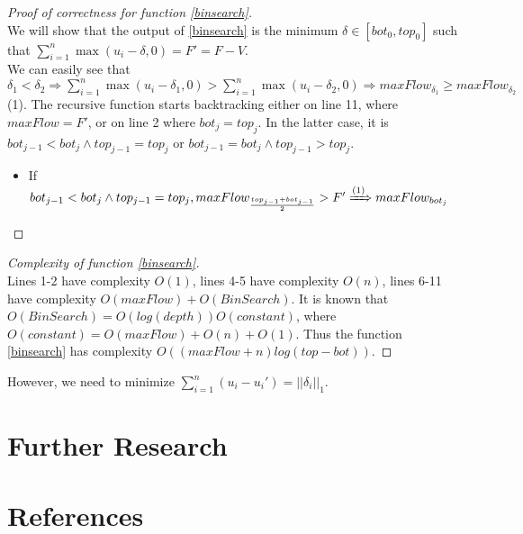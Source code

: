 \documentclass[11pt]{article}
\theoremstyle{definition}
\theoremstyle{corollary}
\begin{document}
    \begin{algorithm}[H]
       \label{binsearch}
       \Output{$\delta$}
       \caption*{\textbf{function} \texttt{BinSearch} }
    \end{algorithm}
    \begin{proof}[Proof of correctness for function \ref{binsearch}] \ \\
       We will show that the output of \ref{binsearch} is the minimum $\delta \in [bot_0, top_0]$ such that
       $\sum\limits_{i=1}^{n}\max{(u_i - \delta, 0)} = F' = F - V$. \\
       We can easily see that $\delta_1 < \delta_2 \Rightarrow \sum\limits_{i=1}^{n}\max{(u_i - \delta_1, 0)} >
       \sum\limits_{i=1}^{n}\max{(u_i - \delta_2, 0)} \Rightarrow maxFlow_{\delta_1} \geq maxFlow_{\delta_2}$ (1).
       The recursive function starts backtracking either on line 11, where $maxFlow = F'$, or on line 2 where $bot_j=top_j$.
       In the latter case, it is $bot_{j-1} < bot_j \wedge top_{j-1} = top_j$ or $bot_{j-1} = bot_j \wedge top_{j-1} >top_j$.
       \begin{itemize}
          \item If $bot_{j-1} < bot_j \wedge top_{j-1} = top_j, maxFlow_{\frac{top_{j-1}+bot_{j-1}}{2}} >F'
          \xRightarrow{(1)} maxFlow_{bot_j}$
       \end{itemize}
       
    \end{proof}
    \begin{proof}[Complexity of function \ref{binsearch}] \ \\
       Lines 1-2 have complexity $O(1)$, lines 4-5 have complexity $O(n)$, lines 6-11 have complexity
       $O(maxFlow) + O(BinSearch)$. It is known that $O(BinSearch) = O(log(depth))O(constant)$, where $O(constant) =
       O(maxFlow) + O(n) + O(1)$. Thus the function \ref{binsearch} has complexity $O((maxFlow +n)log(top-bot))$.
    \end{proof}
    
    However, we need to minimize $\sum\limits_{i=1}^{n}(u_i-u_i') = ||\delta_i||_1$.

  \section{Further Research}

  \section{References}
\end{document}
